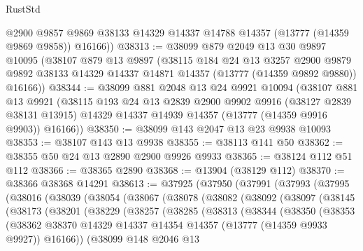 \begin{lexlean}{RustStd}
\begin{coremodule}
        @2900
        @9857
        @9869
        @38133
        @14329
        @14337
        @14788
        @14357
        (@13777 (@14359 @9869 @9858))
        @16166))
@38313 := @38099
    @879
    @2049
    @13
    @30
    @9897
    @10095
    (@38107
      @879
      @13
      @9897
      (@38115
        @184
        @24
        @13
        @3257
        @2900
        @9879
        @9892
        @38133
        @14329
        @14337
        @14871
        @14357
        (@13777 (@14359 @9892 @9880))
        @16166))
@38344 := @38099
    @881
    @2048
    @13
    @24
    @9921
    @10094
    (@38107
      @881
      @13
      @9921
      (@38115
        @193
        @24
        @13
        @2839
        @2900
        @9902
        @9916
        (@38127 @2839 @38131 @13915)
        @14329
        @14337
        @14939
        @14357
        (@13777 (@14359 @9916 @9903))
        @16166))
@38350 := @38099 @143 @2047 @13 @23 @9938 @10093
@38353 := @38107 @143 @13 @9938
@38355 := @38113 @141 @50
@38362 := @38355 @50 @24 @13 @2890 @2900 @9926 @9933
@38365 := @38124 @112 @51 @112
@38366 := @38365 @2890
@38368 := @13904 (@38129 @112)
@38370 := @38366 @38368 @14291
@38613 := @37925
    (@37950
      (@37991
        (@37993
          (@37995
            (@38016
              (@38039
                (@38054
                  (@38067
                    (@38078
                      (@38082
                        (@38092
                          (@38097
                            (@38145
                              (@38173
                                (@38201
                                  (@38229
                                    (@38257
                                      (@38285
                                        (@38313
                                          (@38344
                                            (@38350
                                              (@38353
                                                (@38362
                                                  @38370
                                                  @14329
                                                  @14337
                                                  @14354
                                                  @14357
                                                  (@13777 (@14359 @9933 @9927))
                                                  @16166))
                                              (@38099
                                                @148
                                                @2046
                                                @13

\end{coremodule}
\end{lexlean}
